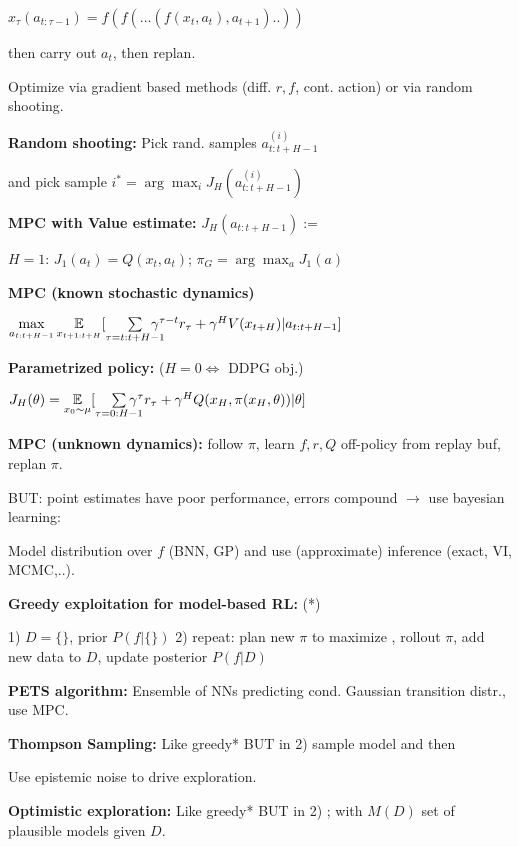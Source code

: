 
$x_\tau(a_{t:\tau-1}) = f(f(...(f(x_t, a_t), a_{t+1})..))$

then carry out $a_t$, then replan.

Optimize via gradient based methods (diff. $r, f$, cont. action) or via random shooting.

\vspace*{-2mm}
\textbf{Random shooting:} Pick rand. samples $a_{t:t+H-1}^{(i)}$

\vspace*{-1mm}
and pick sample $i^* = \arg\max_i J_H(a_{t:t+H-1}^{(i)})$

\textbf{MPC with Value estimate:} $J_H(a_{t:t+H-1}) :=$

$H=1$: $J_1(a_t) = Q(x_t, a_t)$; $\pi_G = \arg\max_a J_1(a)$

\textbf{MPC (known stochastic dynamics)}

{\fontsize{10}{6}\selectfont $\max\limits_{a_{t:t+H-1}} \underset{x_{t+1:t+H}}{\mathbb{E}} [ \sum\limits_{\tau = t:t+H-1} \hspace*{-4mm} \gamma^{\tau - t} r_\tau + \gamma^H V(x_{t+H}) | a_{t:t+H-1} ]$}


\textbf{Parametrized policy:} ($H = 0 \Leftrightarrow$ DDPG obj.)

$J_H(\theta) = \underset{x_0 \sim \mu}{\mathbb{E}} [ \sum\limits_{\tau = 0:H-1} \hspace*{-4mm} \gamma^{\tau} r_\tau + \gamma^H Q(x_{H}, \pi(x_H, \theta)) | \theta ]$

\textbf{MPC (unknown dynamics):} follow $\pi$, learn $f, r, Q$ off-policy from replay buf, replan $\pi$.

BUT: point estimates have poor performance, errors compound $\rightarrow$ use bayesian learning:

Model distribution over $f$ (BNN, GP) and use (approximate) inference (exact, VI, MCMC,..).

\textbf{Greedy exploitation for model-based RL:} \textcolor{mypink}{(*)}

1) $D=\{\}$, prior $P(f|\{\})$ 2) repeat: plan new $\pi$ to maximize , rollout $\pi$, add new data to $D$, update posterior $P(f | D)$

\textbf{PETS algorithm:} Ensemble of NNs predicting cond. Gaussian transition distr., use MPC.

\textbf{Thompson Sampling:} Like greedy\textcolor{mypink}{*} BUT in 2) sample model  and then 

Use epistemic noise to drive exploration.

\textbf{Optimistic exploration:} Like greedy\textcolor{mypink}{*} BUT in 2) ; with $M(D)$ set of plausible models given $D$.

